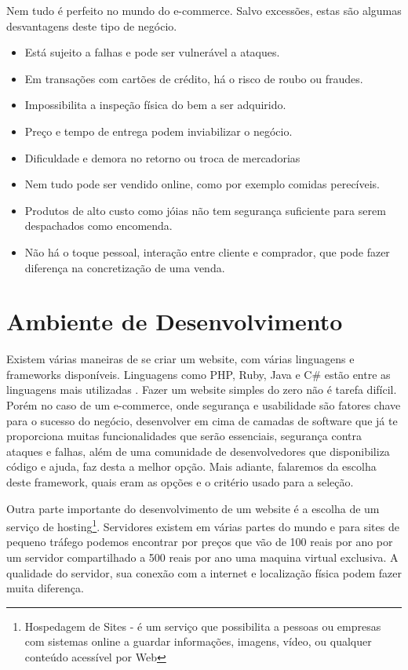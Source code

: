 Nem tudo é perfeito no mundo do e-commerce. Salvo excessões, estas são algumas desvantagens deste tipo de negócio.

\begin{itemize}
  \item Está sujeito a falhas e pode ser vulnerável a ataques.
  \item Em transações com cartões de crédito, há o risco de roubo ou fraudes.
  \item Impossibilita a inspeção física do bem a ser adquirido.
  \item Preço e tempo de entrega podem inviabilizar o negócio.
  \item Dificuldade e demora no retorno ou troca de mercadorias
  \item Nem tudo pode ser vendido online, como por exemplo comidas perecíveis.
  \item Produtos de alto custo como jóias não tem segurança suficiente para serem despachados como encomenda.
  \item Não há o toque pessoal, interação entre cliente e comprador, que pode fazer diferença na concretização de uma venda.
\end{itemize}


\section{Ambiente de Desenvolvimento}

Existem várias maneiras de se criar um website, com várias linguagens e frameworks disponíveis. Linguagens como PHP, Ruby, Java e C# estão entre as linguagens mais utilizadas \cite{UsageStatistics}. Fazer um website simples do zero não é tarefa difícil. Porém no caso de um e-commerce, onde segurança e usabilidade são fatores chave para o sucesso do negócio, desenvolver em cima de camadas de software que já te proporciona muitas funcionalidades que serão essenciais, segurança contra ataques e falhas, além de uma comunidade de desenvolvedores que disponibiliza código e ajuda, faz desta a melhor opção. Mais adiante, falaremos da escolha deste framework, quais eram as opções e o critério usado para a seleção.

Outra parte importante do desenvolvimento de um website é a escolha de um serviço de hosting\footnote{Hospedagem de Sites - é um serviço que possibilita a pessoas ou empresas com sistemas online a guardar informações, imagens, vídeo, ou qualquer conteúdo acessível por Web}. Servidores existem em várias partes do mundo e para sites de pequeno tráfego podemos encontrar por preços que vão de 100 reais por ano por um servidor compartilhado a 500 reais por ano uma maquina virtual exclusiva. A qualidade do servidor, sua conexão com a internet e localização física podem fazer muita diferença.

